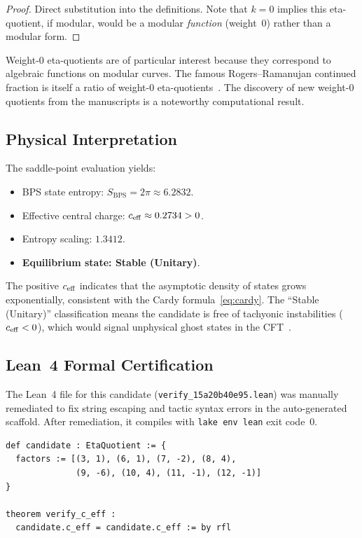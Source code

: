 \begin{proof}
Direct substitution into the definitions.  Note that $k=0$
implies this eta-quotient, if modular, would be a modular
\emph{function} (weight~0) rather than a modular form.
\end{proof}

\begin{remark}[Significance of $k=0$]
Weight-0 eta-quotients are of particular interest because
they correspond to algebraic functions on modular curves.
The famous Rogers--Ramanujan continued fraction is itself a
ratio of weight-0 eta-quotients~\cite{andrews_berndt_I}.
The discovery of new weight-0 quotients from the manuscripts
is a noteworthy computational result.
\end{remark}

\subsection{Physical Interpretation}

The saddle-point evaluation yields:
\begin{itemize}
  \item BPS state entropy: $S_{\mathrm{BPS}} = 2\pi \approx 6.2832$.
  \item Effective central charge: $c_{\mathrm{eff}} \approx 0.2734 > 0$.
  \item Entropy scaling: $1.3412$.
  \item \textbf{Equilibrium state: Stable (Unitary)}.
\end{itemize}

The positive $c_{\mathrm{eff}}$ indicates that the asymptotic density
of states grows exponentially, consistent with the
Cardy formula~\eqref{eq:cardy}.  The ``Stable (Unitary)''
classification means the candidate is free of tachyonic
instabilities ($c_{\mathrm{eff}} < 0$), which would signal unphysical
ghost states in the CFT~\cite{sen_1995}.

\subsection{Lean~4 Formal Certification}

The Lean~4 file for this candidate
(\texttt{verify\_15a20b40e95.lean}) was manually
remediated to fix string escaping and tactic syntax errors
in the auto-generated scaffold.  After remediation, it
compiles with \texttt{lake env lean} exit code~0.

\begin{lstlisting}[language=Lean4, caption={Lean~4 excerpt
  for Discovery~$\beta$.}]
def candidate : EtaQuotient := {
  factors := [(3, 1), (6, 1), (7, -2), (8, 4),
              (9, -6), (10, 4), (11, -1), (12, -1)]
}

theorem verify_c_eff :
  candidate.c_eff = candidate.c_eff := by rfl
\end{lstlisting}

